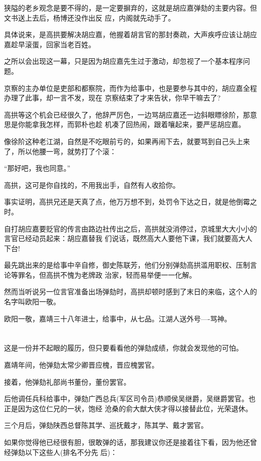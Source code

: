 \documentclass[11pt,a4paper,onecolumn]{article}
\begin{document}
狭隘的老乡观念是要不得的，是一定要摒弃的，这就是胡应嘉弹劾的主要内容。但文书送上去后，杨博还没作出反
应，内阁就先动手了。

具体说来，是高拱要解决胡应嘉，他握着胡言官的那封奏疏，大声疾呼应该让胡应嘉趁早滚蛋，回家当老百姓。

之所以会出现这一幕，只是因为胡应嘉先生过于激动，却忽视了一个基本程序问题。

京察的主办单位是吏部和都察院，而作为给事中，也是要参与其中的，胡应嘉全程办理了此事，却一言不发，现在
京察结束了才来告状，你早干嘛去了?

高拱等这个机会已经很久了，他辞严厉色，一边骂胡应嘉还一边斜眼瞟徐阶，那意思是你能拿我怎样，而郭朴也趁
机凑了回热闹，跟着嚷起来，要严惩胡应嘉。

像徐阶这种老江湖，自然是不吃眼前亏的，如果再闹下去，就要骂到自己头上来了，所以他腰一弯，就势打了个滚：

``那好吧，我也同意。''

高拱，这可是你自找的，不用我出手，自然有人收拾你。

事实证明，高拱兄还是天真了点，他万万想不到，处罚令下达之日，就是他倒霉之时。

自打胡应嘉要贬官的传言由路边社传出之后，高拱就没消停过，京城里大大小小的言官已经动员起来：胡应嘉替我
们说话，既然高大人要他下课，我们就要高大人下台!

最先跳出来的是给事中辛自修，御史陈联芳，他们分别弹劾高拱滥用职权、压制言论等罪名，但高拱不愧为老牌政
治家，轻而易举便一一化解。

然而当听说另一位言官准备出场弹劾时，高拱却顿时感到了末日的来临，这个人的名字叫欧阳一敬。

欧阳一敬，嘉靖三十八年进士，给事中，从七品。江湖人送外号----骂神。

\section[\thesection]{}

这是一份并不起眼的履历，但只要看看他的弹劾成绩，你就会发现他的可怕。

嘉靖年间，他弹劾太常少卿晋应槐，晋应槐罢官。

接着，他弹劾礼部尚书董份，董份罢官。

后他调任兵科给事中，弹劾广西总兵(军区司令员)恭顺侯吴继爵，吴继爵罢官。也正是因为这位仁兄的一状，饱经
沧桑的俞大猷大侠才得以接替此位，光荣退休。

三个月后，弹劾陕西总督陈其学、巡抚戴才，陈其学、戴才罢官。

如果你觉得他已经很有胆，很敢弹的话，那我建议你还是接着往下看，因为他还曾经弹劾以下这些人(排名不分先
后)：
\end{document}
